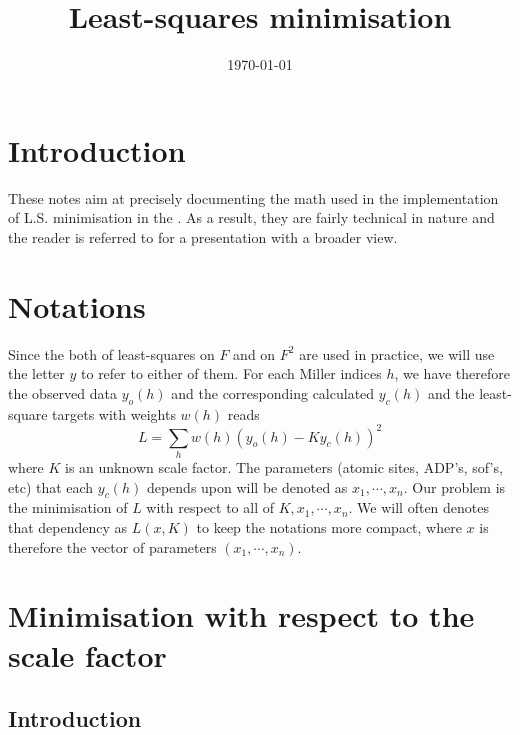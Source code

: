 \documentclass[11pt]{article}
\title{Least-squares minimisation}
\author{\lucjbourhisatdurham}
\date{\today}
\begin{document}
\maketitle

\section{Introduction}

These notes aim at precisely documenting the math used in the implementation of L.S. minimisation in the  \cite{cctbx}. As a result, they are fairly technical in nature and the reader is referred to \cite{compcommageconcern:2009} for a presentation with a broader view.

\section{Notations}

Since the both of least-squares on $F$ and on $F^2$ are used in practice, we will use the letter $y$ to refer to either of them. For each Miller indices $h$, we have therefore the observed data $y_o(h)$ and the corresponding calculated $y_c(h)$ and the least-square targets with weights $w(h)$ reads
\begin{equation}
L = \sum_h w(h) (y_o(h) - K y_c(h))^2
\label{eqn:L:def}
\end{equation}
where $K$ is an unknown scale factor. The parameters (atomic sites, ADP's, sof's, etc) that each $y_c(h)$ depends upon will be denoted as $x_1, \cdots, x_n$. Our problem is the minimisation of $L$ with respect to all of $K, x_1, \cdots, x_n$. We will often denotes that dependency as $L(x, K)$ to keep the notations more compact, where $x$ is therefore the vector of parameters $(x_1, \cdots, x_n)$.

\section{Minimisation with respect to the scale factor}

\subsection{Introduction}
\end{document}
